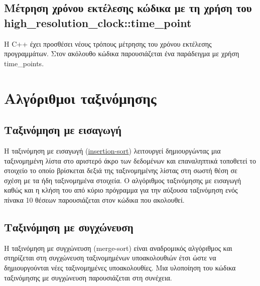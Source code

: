 

\subsection{Μέτρηση χρόνου εκτέλεσης κώδικα με τη χρήση του high\_resolution\_clock::time\_point}
Η C++ έχει προσθέσει νέους τρόπους μέτρησης του χρόνου εκτέλεσης προγραμμάτων. Στον ακόλουθο κώδικα παρουσιάζεται ένα παράδειγμα με χρήση time\_points.






\section{Αλγόριθμοι ταξινόμησης}
\subsection{Ταξινόμηση με εισαγωγή}
Η ταξινόμηση με εισαγωγή (\href{http://rosettacode.org/wiki/Sorting_algorithms/Insertion_sort}{insertion-sort}) λειτουργεί δημιουργώντας μια ταξινομημένη λίστα στο αριστερό άκρο των δεδομένων και επαναληπτικά τοποθετεί το στοιχείο το οποίο βρίσκεται δεξιά της ταξινομημένης λίστας στη σωστή θέση σε σχέση με τα ήδη ταξινομημένα στοιχεία. Ο αλγόριθμος ταξινόμησης με εισαγωγή καθώς και η κλήση του από κύριο πρόγραμμα για την αύξουσα ταξινόμηση ενός πίνακα 10 θέσεων παρουσιάζεται στον κώδικα που ακολουθεί.







\subsection{Ταξινόμηση με συγχώνευση}
Η ταξινόμηση με συγχώνευση (merge-sort) είναι αναδρομικός αλγόριθμος και στηρίζεται στη συγχώνευση ταξινομημένων υποακολουθιών έτσι ώστε να δημιουργούνται νέες ταξινομημένες υποακολουθίες. Μια υλοποίηση του κώδικα ταξινόμησης με συγχώνευση παρουσιάζεται στη συνέχεια. 




